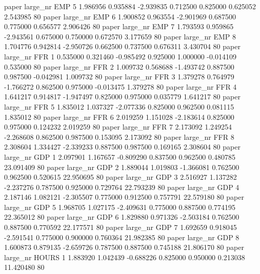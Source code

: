        paper   large_nr      EMP                 5  1.986956  0.935884  -2.939835 0.712500 0.825000  0.625052    2.543985 80
       paper   large_nr      EMP                 6  1.900852  0.963554  -2.901969 0.687500 0.775000  0.656577    2.906426 80
       paper   large_nr      EMP                 7  1.793593  0.959865  -2.943561 0.675000 0.750000  0.672570    3.177659 80
       paper   large_nr      EMP                 8  1.704776  0.942814  -2.950726 0.662500 0.737500  0.676311    3.430704 80
       paper   large_nr      FFR                 1  0.535000  0.321460  -0.985492 0.925000 1.000000 -0.014109    0.535000 80
       paper   large_nr      FFR                 2  1.009732  0.568688  -1.493742 0.887500 0.987500 -0.042981    1.009732 80
       paper   large_nr      FFR                 3  1.379278  0.764979  -1.766272 0.862500 0.975000 -0.013475    1.379278 80
       paper   large_nr      FFR                 4  1.641217  0.914817  -1.947497 0.825000 0.975000  0.035779    1.641217 80
       paper   large_nr      FFR                 5  1.835012  1.037327  -2.077336 0.825000 0.962500  0.081115    1.835012 80
       paper   large_nr      FFR                 6  2.019259  1.151028  -2.183614 0.825000 0.975000  0.124232    2.019259 80
       paper   large_nr      FFR                 7  2.173092  1.249254  -2.268608 0.862500 0.987500  0.153095    2.173092 80
       paper   large_nr      FFR                 8  2.308604  1.334427  -2.339233 0.887500 0.987500  0.169165    2.308604 80
       paper   large_nr      GDP                 1  2.097901  1.167657  -0.809290 0.837500 0.962500  0.480785   23.091409 80
       paper   large_nr      GDP                 2  1.889044  1.019803  -1.366081 0.762500 0.962500  0.520615   22.950695 80
       paper   large_nr      GDP                 3  2.516927  1.137282  -2.237276 0.787500 0.925000  0.729764   22.793239 80
       paper   large_nr      GDP                 4  2.187146  1.082121  -2.305507 0.775000 0.912500  0.757791   22.579180 80
       paper   large_nr      GDP                 5  1.968705  1.027175  -2.409631 0.775000 0.887500  0.774195   22.365012 80
       paper   large_nr      GDP                 6  1.829880  0.971326  -2.503184 0.762500 0.887500  0.770592   22.177571 80
       paper   large_nr      GDP                 7  1.692659  0.918045  -2.591541 0.775000 0.900000  0.760364   21.982385 80
       paper   large_nr      GDP                 8  1.600873  0.879135  -2.659726 0.787500 0.887500  0.745188   21.806170 80
       paper   large_nr    HOURS                 1  1.883920  1.042439  -0.688226 0.825000 0.950000  0.213038   11.420480 80
